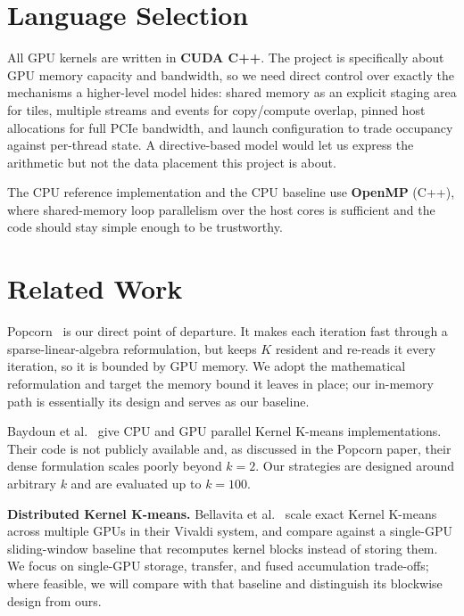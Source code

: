 \documentclass[sigconf]{acmart}
\begin{document}
\section{Language Selection}

All GPU kernels are written in \textbf{CUDA C++}. The project is specifically
about GPU memory capacity and bandwidth, so we need direct control over exactly
the mechanisms a higher-level model hides: shared memory as an explicit staging
area for tiles, multiple streams and events for copy/compute overlap, pinned
host allocations for full PCIe bandwidth, and launch configuration to trade
occupancy against per-thread state. A directive-based model would let us
express the arithmetic but not the data placement this project is about.

The CPU reference implementation and the CPU baseline use \textbf{OpenMP}
(C++), where shared-memory loop parallelism over the host cores is sufficient
and the code should stay simple enough to be trustworthy.

\section{Related Work}

Popcorn~\cite{popcorn2025} is our direct point of departure. It makes each
iteration fast through a sparse-linear-algebra reformulation, but keeps $K$
resident and re-reads it every iteration, so it is bounded by GPU memory. We
adopt the mathematical reformulation and target the memory bound it leaves in
place; our in-memory path is essentially its design and serves as our baseline.

Baydoun et al.~\cite{baydoun2018} give CPU and GPU parallel Kernel K-means
implementations. Their code is not publicly available and, as discussed in the
Popcorn paper, their dense formulation scales poorly beyond $k = 2$. Our
strategies are designed around arbitrary $k$ and are evaluated up to $k = 100$.

\textbf{Distributed Kernel K-means.} Bellavita et al.~\cite{bellavita2026}
scale exact Kernel K-means across multiple GPUs in their Vivaldi system, and
compare against a single-GPU sliding-window baseline that recomputes kernel
blocks instead of storing them. We focus on
single-GPU storage, transfer, and fused accumulation trade-offs; where
feasible, we will compare with that baseline and distinguish its blockwise
design from ours.
\end{document}
